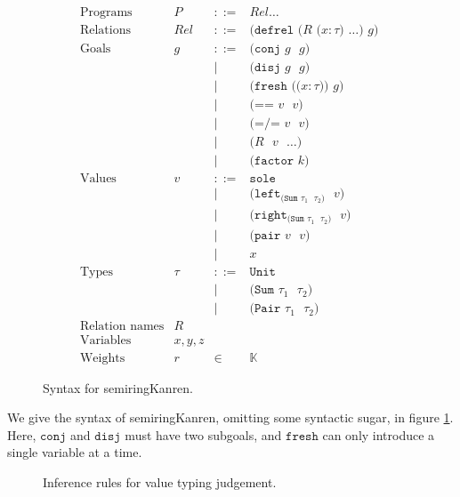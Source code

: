 \documentclass{report}
\theoremstyle{definition}
\begin{document}
\begin{figure}
\[
\begin{array}{lrcl}
	\textrm{Programs} & P & ::= & \mathit{Rel}\dots \\
	\textrm{Relations} & Rel & ::= & \texttt{(defrel (\(R\) (\(x:\tau\)) \(\dots\)) \(g\)) } \\
	\textrm{Goals} & g & ::= & \texttt{(conj \(g\) \(g\))} \\
	& & | & \texttt{(disj \(g\) \(g\))} \\
	& & | & \texttt{(fresh ((\(x:\tau\))) \(g\))} \\
	& & | & \texttt{(== \(v\) \(v\))} \\
	& & | & \texttt{(=/= \(v\) \(v\))} \\
	& & | & \texttt{(\(R\) \(v\) \(\dots\))} \\
	& & | & \texttt{(factor \(k\))} \\
	\textrm{Values} & v & ::= & \texttt{sole} \\
	& & | & \texttt{(left\(_{\texttt{(Sum \(\tau_1\) \(\tau_2\))}}\) \(v\))} \\
	& & | & \texttt{(right\(_{\texttt{(Sum \(\tau_1\) \(\tau_2\))}}\) \(v\))} \\
	& & | & \texttt{(pair \(v\) \(v\))} \\
	& & | & x \\
	\textrm{Types} & \tau & ::= & \texttt{Unit} \\
	& & | & \texttt{(Sum \(\tau_1\) \(\tau_2\))} \\
	& & | & \texttt{(Pair \(\tau_1\) \(\tau_2\))} \\
	\textrm{Relation names} & R & & \\
	\textrm{Variables} & x,y,z & & \\
	\textrm{Weights} & r & \in & \mathbb{K}
\end{array}
\]
	\caption{Syntax for semiringKanren.}
	\label{fig:semiringkanren-syntax}
\end{figure}

We give the syntax of semiringKanren, omitting some syntactic sugar, in figure \ref{fig:semiringkanren-syntax}.
Here, \(\texttt{conj}\) and \(\texttt{disj}\) must have two subgoals, and \(\texttt{fresh}\) can only introduce a single variable at a time.

\begin{figure}
\caption{Inference rules for value typing judgement.}
\label{fig:value-types}
\end{figure}
\end{document}
